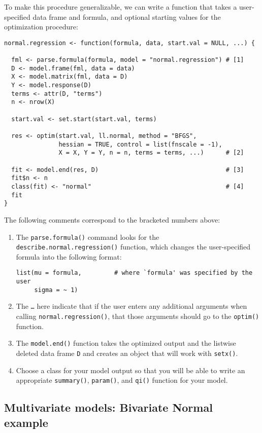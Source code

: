To make this procedure generalizable, we can write a function that
takes a user-specified data frame and formula, and optional starting
values for the optimization procedure:  
\begin{verbatim}
normal.regression <- function(formula, data, start.val = NULL, ...) {

  fml <- parse.formula(formula, model = "normal.regression") # [1]
  D <- model.frame(fml, data = data)
  X <- model.matrix(fml, data = D)
  Y <- model.response(D)
  terms <- attr(D, "terms")
  n <- nrow(X)

  start.val <- set.start(start.val, terms)

  res <- optim(start.val, ll.normal, method = "BFGS",        
               hessian = TRUE, control = list(fnscale = -1),
               X = X, Y = Y, n = n, terms = terms, ...)      # [2]

  fit <- model.end(res, D)                                   # [3]
  fit$n <- n
  class(fit) <- "normal"                                     # [4]
  fit                                                        
}
\end{verbatim}
The following comments correspond to the bracketed numbers above:  
\begin{enumerate}
\item The {\tt parse.formula()} command looks for the {\tt
describe.normal.regression()} function, which changes the
user-specified formula into the following format:  
\begin{verbatim}
list(mu = formula,         # where `formula' was specified by the user
     sigma = ~ 1)
\end{verbatim}
\item The {\tt \dots} here indicate that if the user enters any
additional arguments when calling {\tt normal.regression()}, that
those arguments should go to the {\tt optim()} function.  
\item The {\tt model.end()} function takes the optimized output and
the listwise deleted data frame {\tt D} and creates an object that
will work with {\tt setx()}.  
\item Choose a class for your model output so that you will be able to
write an appropriate {\tt summary()}, {\tt param()}, and {\tt qi()}
function for your model.  
\end{enumerate}

\subsection{Multivariate models: Bivariate Normal example}\label{bivariate.probit}

